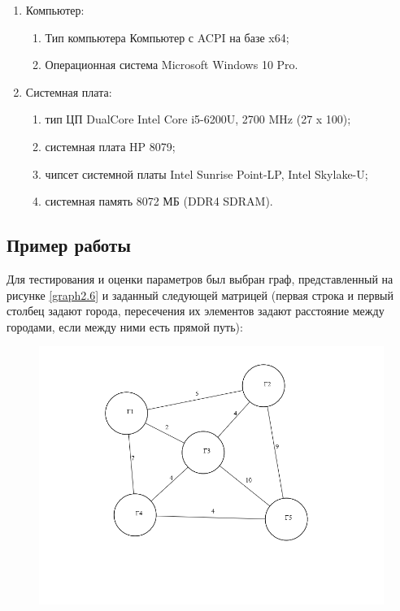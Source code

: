\documentclass[../main.tex]{subfiles}
\begin{document}
	\begin{enumerate}[1)]
		\item Компьютер:
		\begin{enumerate}
			\item Тип компьютера   Компьютер с ACPI на базе x64;
			\item Операционная система   Microsoft Windows 10 Pro.
		\end{enumerate}
		\item Системная плата:
		\begin{enumerate}
			\item тип ЦП   DualCore Intel Core i5-6200U, 2700 MHz (27 x 100);
			\item системная плата   HP 8079;
			\item чипсет системной платы   Intel Sunrise Point-LP, Intel Skylake-U;
			\item системная память   8072 МБ (DDR4 SDRAM).
		\end{enumerate}
	\end{enumerate}

\subsection{Пример работы}

	Для тестирования и оценки параметров был выбран граф, представленный на рисунке \ref{graph2.6} и заданный следующей матрицей (первая строка и первый столбец задают города, пересечения их элементов задают расстояние между городами, если между ними есть прямой путь):
	
	\begin{figure}[H]
		\centering
		\includegraphics[scale=0.5]{src/img/4}
		\caption{}
		\label{fig:4}
	\end{figure}
	
\end{document}
